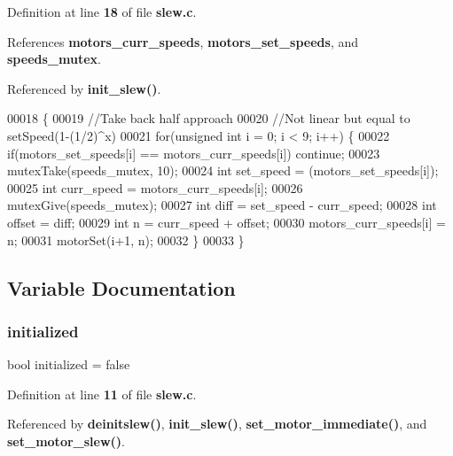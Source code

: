 Definition at line \textbf{ 18} of file \textbf{ slew.\+c}.



References \textbf{ motors\+\_\+curr\+\_\+speeds}, \textbf{ motors\+\_\+set\+\_\+speeds}, and \textbf{ speeds\+\_\+mutex}.



Referenced by \textbf{ init\+\_\+slew()}.


\begin{DoxyCode}
00018                    \{
00019   \textcolor{comment}{//Take back half approach}
00020   \textcolor{comment}{//Not linear but equal to setSpeed(1-(1/2)^x)}
00021   \textcolor{keywordflow}{for}(\textcolor{keywordtype}{unsigned} \textcolor{keywordtype}{int} i = 0; i < 9; i++) \{
00022     \textcolor{keywordflow}{if}(motors_set_speeds[i] == motors_curr_speeds[i]) \textcolor{keywordflow}{continue};
00023     mutexTake(speeds_mutex, 10);
00024     \textcolor{keywordtype}{int} set\_speed = (motors_set_speeds[i]);
00025     \textcolor{keywordtype}{int} curr\_speed = motors_curr_speeds[i];
00026     mutexGive(speeds_mutex);
00027     \textcolor{keywordtype}{int} diff = set\_speed - curr\_speed;
00028     \textcolor{keywordtype}{int} offset = diff;
00029     \textcolor{keywordtype}{int} n = curr\_speed + offset;
00030     motors_curr_speeds[i] = n;
00031     motorSet(i+1, n);
00032   \}
00033 \}
\end{DoxyCode}


\subsection{Variable Documentation}
\mbox{\label{slew_8c_aedeffc7d23da25d52b9a50045189fe2b}} 
\subsubsection{initialized}
{\footnotesize\ttfamily bool initialized = false\hspace{0.3cm}{\ttfamily [static]}}



Definition at line \textbf{ 11} of file \textbf{ slew.\+c}.



Referenced by \textbf{ deinitslew()}, \textbf{ init\+\_\+slew()}, \textbf{ set\+\_\+motor\+\_\+immediate()}, and \textbf{ set\+\_\+motor\+\_\+slew()}.

\mbox{\label{slew_8c_a69e0d1204ea4d87b7366c9cd79527984}} 
